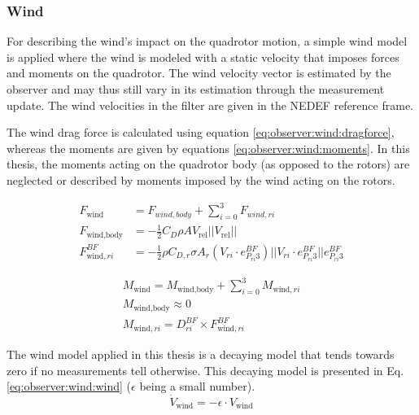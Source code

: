 \subsubsection{Wind}
    For describing the wind's impact on the quadrotor motion,
    a simple wind model is applied where the wind is modeled with
    a static velocity that imposes forces and moments on the quadrotor.
    The wind velocity vector is estimated by the observer and may thus still vary
    in its estimation through the measurement update.
    The wind velocities in the filter are given in the NEDEF reference frame.

    The wind drag force is calculated using equation \eqref{eq:observer:wind:dragforce},
    whereas the moments are given by equations \eqref{eq:observer:wind:moments}.
    In this thesis, the moments acting on the quadrotor body (as opposed to the rotors)
    are neglected or described by moments imposed by the wind acting on the rotors.

    \begin{subequations}
    \label{eq:observer:wind:dragforce}
        \begin{align}
            F_{\text{wind}} &= F_{wind,body} + \sum_{i=0}^{3} F_{wind,ri} \\
%
            F_{\text{wind,body}} &= -\frac{1}{2} C_{D} \rho A V_{\text{rel}} ||V_{\text{rel}}|| \\
%
            F^{BF}_{\text{wind},ri} &= -\frac{1}{2} \rho C_{D,r} \sigma A_{r} (V_{ri} \cdot e_{P_{ri}3}^{BF}) ||V_{ri} \cdot e_{P_{ri}3}^{BF}|| e_{P_{ri}3}^{BF}
        \end{align}
    \end{subequations}

    \begin{subequations}
    \label{eq:observer:wind:moments}
        \begin{align}
            M_{\text{wind}} = M_{\text{wind,body}} + \sum_{i=0}^{3}M_{\text{wind},ri} \\
%
            M_{\text{wind,body}} \approx 0 \\ %
%
            M_{\text{wind},ri} = D_{ri}^{BF} \times F^{BF}_{\text{wind},ri}
        \end{align}
    \end{subequations}

    The wind model applied in this thesis is a decaying model that tends
    towards zero if no measurements tell otherwise.
    This decaying model is presented in Eq. \eqref{eq:observer:wind:wind} ($\epsilon$ being a small number).
    \begin{equation}
        \label{eq:observer:wind:wind}
        \dot{V}_{\text{wind}} = -\epsilon \cdot V_{\text{wind}}
    \end{equation}


